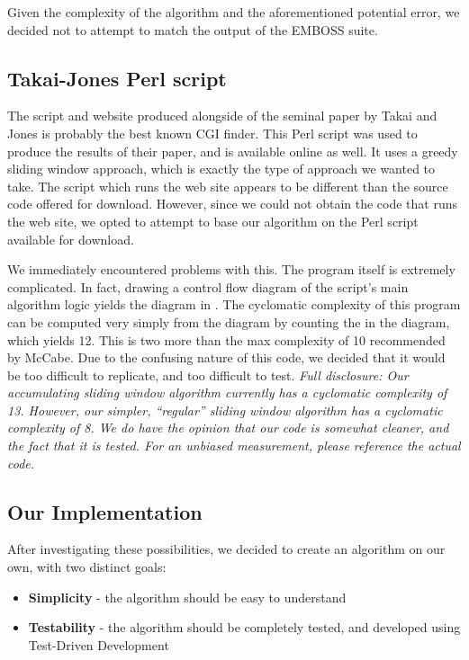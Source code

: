 \documentclass{bioinfo}
\begin{document}
Given the complexity of the algorithm and the aforementioned potential
error, we decided not to attempt to match the output of the EMBOSS
suite.

\subsection{Takai-Jones Perl script}

The script and website produced alongside of the seminal paper by
Takai and Jones is probably the best known CGI finder. This Perl
script was used to produce the results of their paper, and is
available online as well. It uses a greedy sliding window approach,
which is exactly the type of approach we wanted to take. The script
which runs the web site appears to be different than the source code
offered for download. However, since we could not obtain the code that
runs the web site, we opted to attempt to base our algorithm on the
Perl script available for download.

We immediately encountered problems with this. The program itself is
extremely complicated. In fact, drawing a control flow diagram of the
script's main algorithm logic yields the diagram in
. The cyclomatic complexity of this program
can be computed very simply from the diagram by counting the
 in the diagram, which yields 12. This
is two more than the max complexity of 10 recommended by McCabe. Due
to the confusing nature of this code, we decided that it would be too
difficult to replicate, and too difficult to test. \textit{Full
  disclosure: Our accumulating sliding window algorithm currently has
  a cyclomatic complexity of 13. However, our simpler, ``regular''
  sliding window algorithm has a cyclomatic complexity of 8. We do
  have the opinion that our code is somewhat cleaner, and the fact
  that it is tested. For an unbiased measurement, please reference the
  actual code.}

\subsection{Our Implementation}

After investigating these possibilities, we decided to create an
algorithm on our own, with two distinct goals:

\begin{itemize}
\item \textbf{Simplicity} - the algorithm should be easy to understand
\item \textbf{Testability} - the algorithm should be completely tested, and
  developed using Test-Driven Development
\end{itemize}
\end{document}
